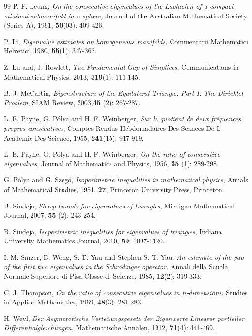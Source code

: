 \documentclass[12pt]{article}
\numberwithin{equation}{section}
\begin{document}
\begin{thebibliography}{99}
P.-F. Leung, {\it On the consecutive eigenvalues of the Laplacian of a compact minimal submanifold in
a sphere,} Journal of the Australian Mathematical Society (Series A), 1991, {\bf 50}(03): 409-426.

P. Li, {\it Eigenvalue estimates on homogeneous manifolds,}  Commentarii Mathematici Helvetici, 1980, {\bf 55}(1): 347-363.


Z. Lu and, J. Rowlett, {\it The Fundamental Gap of Simplices},  Communications in Mathematical Physics,  2013,  {\bf 319}(1): 111-145.

B. J. McCartin, {\it Eigenstructure of the Equilateral
Triangle, Part I: The Dirichlet Problem}, SIAM
Review, 2003,{\bf 45} (2):  267-287.

L. E. Payne, G. P\'{o}lya and H. F. Weinberger, {\it  Sur le quotient de deux fr\'{e}quences propres cons\'{e}cutives},
Comptes Rendus  Hebdomadaires Des Seances De L Academie Des Science, 1955, {\bf 241}(15): 917-919.

L. E. Payne, G. P\'{o}lya and H. F. Weinberger, {\it On the ratio of consecutive eigenvalues}, Journal of Mathematics and Physics, 1956, {\bf 35} (1): 289-298.


G. P\'{o}lya and G. Szeg\"{o}, {\it Isoperimetric inequalities in mathematical physics}, Annals of Mathematical Studies, 1951, {\bf 27}, Princeton
University Press, Princeton.

B. Siudeja, {\it Sharp bounds for eigenvalues of triangles}, Michigan Mathematical Journal, 2007, {\bf 55} (2): 243-254.

B. Siudeja, {\it Isoperimetric inequalities for eigenvalues of triangles}, Indiana University Mathematics Journal, 2010, {\bf 59}: 1097-1120.

I. M. Singer, B. Wong, S. T. Yau and Stephen S. T. Yau, {\it An estimate of the gap of the first two
eigenvalues in the Schr\"{o}dinger operator,} Annali della Scuola Normale Superiore di Pisa-Classe di Scienze, 1985, {\bf 12}(2): 319-333.


C. J. Thompson, {\it On the ratio of consecutive eigenvalues in $n$-dimensions,}  Studies in Applied Mathematics, 1969, {\bf 48}(3): 281-283.

H. Weyl, {\it Der Asymptotische Verteilungsgesetz der Eigenwerte Linearer partieller Differentialgleichungen,} Mathematische Annalen, 1912, {\bf71}(4): 441-469.



\end{thebibliography}
\end{document}
